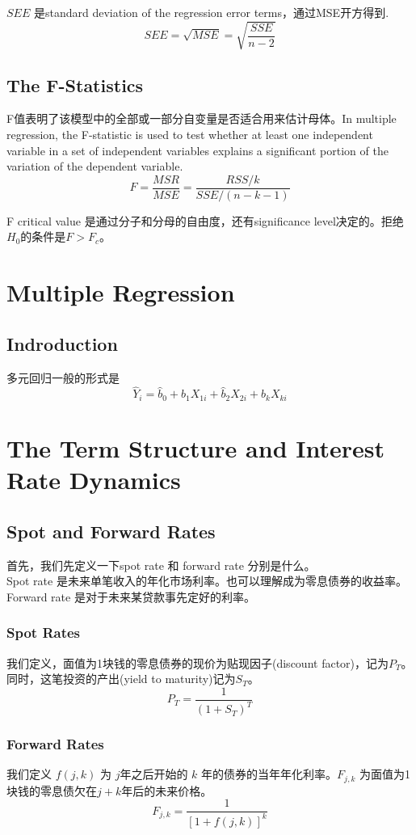 \documentclass[cn,11pt,chinese]{elegantbook}
\begin{document}
    \(SEE\) 是standard deviation of the regression error terms，通过MSE开方得到.
    \[SEE = \sqrt{MSE} = \sqrt{\frac{SSE}{n - 2}}\]

\section{The F-Statistics}
    F值表明了该模型中的全部或一部分自变量是否适合用来估计母体。In multiple regression, the F-statistic is used to test whether at least one independent variable in a set of independent variables explains a significant portion of the variation of the dependent variable.
    \[F = \frac{MSR}{MSE} = \frac{RSS / k}{SSE / (n - k - 1)}\]

    F critical value 是通过分子和分母的自由度，还有significance level决定的。拒绝\(H_0\)的条件是\(F > F_c\)。

\chapter{Multiple Regression}
\section{Indroduction}
    多元回归一般的形式是 \[\hat Y_i = \hat b_0 + \hat b_1 X_{1i} + \hat b_2 X_{2i} + \hat b_k X_{ki}\]

\chapter{The Term Structure and Interest Rate Dynamics}
\section{Spot and Forward Rates}
    首先，我们先定义一下spot rate 和 forward rate 分别是什么。\\
    Spot rate 是未来单笔收入的年化市场利率。也可以理解成为零息债券的收益率。\\
    Forward rate 是对于未来某贷款事先定好的利率。

    \subsection{Spot Rates}
        我们定义，面值为1块钱的零息债券的现价为贴现因子(discount factor)，记为\(P_T\)。同时，这笔投资的产出(yield to maturity)记为\(S_T\)。
            \[P_T = \frac{1}{(1 + S_T)^T}\]
    
    \subsection{Forward Rates}
        我们定义 \(f(j,k) \) 为 \(j\)年之后开始的 \(k\) 年的债券的当年年化利率。\(F_{j, k}\) 为面值为1块钱的零息债欠在\(j + k\)年后的未来价格。
        \[F_{j, k} = \frac{1}{[1 + f(j, k)]^k}\]
        
\end{document}
